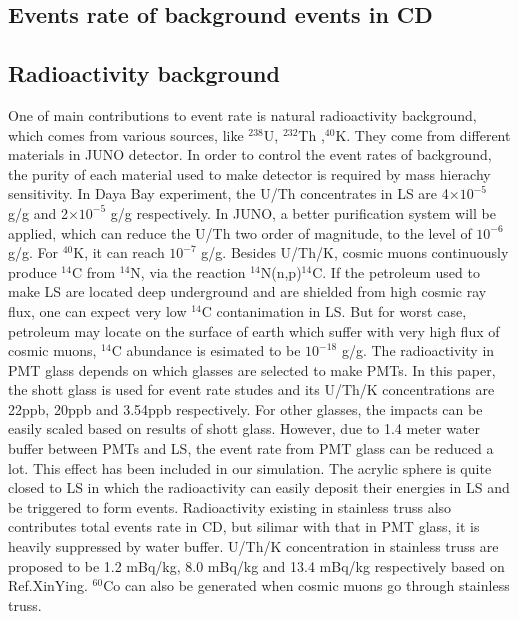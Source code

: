 \documentclass[a4paper,10pt,twoside]{paper}
\begin{document}
\begin{multicols}{2}
                
                \section{Events rate of background events in CD}
                \subsection{Radioactivity background}
                One of main contributions to event rate is natural radioactivity background, which comes from various sources, like $^{238}$U, $^{232}$Th ,$^{40}$K. 
                They come from different materials in JUNO detector. In order to control the event rates of background, the purity of each material used to make detector is required by mass hierachy sensitivity.
		In Daya Bay experiment, the U/Th concentrates in LS are 4$\times10^{-5}$ g/g and 2$\times10^{-5}$ g/g respectively.
		In JUNO, a better purification system will be applied, which can reduce the U/Th two order of magnitude, to the level of $10^{-6}$ g/g. For $^{40}$K, it can reach $10^{-7}$ g/g. 
		Besides U/Th/K, cosmic muons continuously produce $^{14}$C from $^{14}$N, via the reaction $^{14}$N(n,p)$^{14}$C.
		If the petroleum used to make LS are located deep underground and are shielded from high cosmic ray flux, one can expect very low $^{14}$C contanimation in LS. 
		But for worst case, petroleum may locate on the surface of earth which suffer with very high flux of cosmic muons, $^{14}$C abundance is esimated to be $10^{-18}$ g/g.
		The radioactivity in PMT glass depends on which glasses are selected to make PMTs.
		In this paper, the shott glass is used for event rate studes and its U/Th/K concentrations are 22ppb, 20ppb and 3.54ppb respectively.
		For other glasses, the impacts can be easily scaled based on results of shott glass. 
		However, due to 1.4 meter water buffer between PMTs and LS, the event rate from PMT glass can be reduced a lot. This effect has been included in our simulation.
                The acrylic sphere is quite closed to LS in which the radioactivity can easily deposit their energies in LS and be triggered to form events.
                Radioactivity existing in stainless truss also contributes total events rate in CD, but silimar with that in PMT glass, it is heavily suppressed by water buffer.
                U/Th/K concentration in stainless truss are proposed to be 1.2 mBq/kg, 8.0 mBq/kg and 13.4 mBq/kg respectively based on Ref.XinYing.
		$^{60}$Co can also be generated when cosmic muons go through stainless truss.

\end{multicols}
\end{document}
